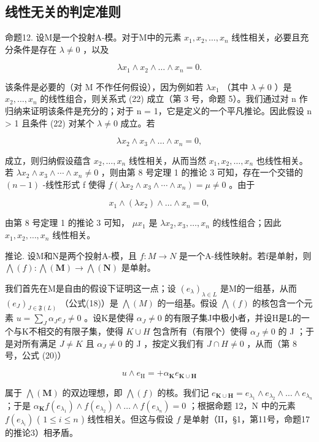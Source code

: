 \subsection{线性无关的判定准则}

命题12. 设M是一个投射A-模。对于M中的元素 \(x_1, x_2, \ldots, x_n\) 线性相关，必要且充分条件是存在 \(\lambda \neq 0\) ，以及

\[
\lambda x _ {1} \wedge x _ {2} \wedge \dots \wedge x _ {n} = 0.\tag{22}
\]

该条件是必要的（对 M 不作任何假设），因为例如若 \(\lambda x_{1}\) （其中 \(\lambda \neq 0\) ）是 \(x_{2}, \ldots, x_{n}\) 的线性组合，则关系式 (22) 成立（第 3 号，命题 5）。我们通过对 n 作归纳来证明该条件是充分的；对于 n = 1，它是定义的一个平凡推论。因此假设 n \textgreater{} 1 且条件 (22) 对某个 \(\lambda \neq 0\) 成立。若

\[
\lambda x _ {2} \wedge x _ {3} \wedge \dots \wedge x _ {n} = 0,
\]

成立，则归纳假设蕴含 \(x_{2},\ldots,x_{n}\) 线性相关，从而当然 \(x_{1},x_{2},\ldots,x_{n}\) 也线性相关。若 \(\lambda x_{2}\wedge x_{3}\wedge\cdots\wedge x_{n}\neq0\) ，则由第 8 号定理 1 的推论 3 可知，存在一个交错的 \((n-1)\) -线性形式 f 使得 \(f(\lambda x_{2}\wedge x_{3}\wedge\cdots\wedge x_{n})=\mu\neq0\) 。由于

\[
x _ {1} \wedge (\lambda x _ {2}) \wedge \dots \wedge x _ {n} = 0,
\]

由第 8 号定理 1 的推论 3 可知， \(\mu x_{1}\) 是 \(\lambda x_{2}, x_{3}, \ldots, x_{n}\) 的线性组合；因此 \(x_{1}, x_{2}, \ldots, x_{n}\) 线性相关。

推论. 设M和N是两个投射A-模，且 \(f:M\to N\) 是一个A-线性映射。若f是单射，则 \(\bigwedge(f):\bigwedge(\mathbf{M})\to\bigwedge(\mathbf{N})\) 是单射。

我们首先在M是自由的假设下证明这一点；设 \((e_{\lambda})_{\lambda \in L}\) 是M的一组基，从而 \((e_{J})_{J \in \mathfrak{F}(L)}\) （公式(18)）是 \(\bigwedge(M)\) 的一组基。假设 \(\bigwedge(f)\) 的核包含一个元素 \(u = \sum_{J} \alpha_{J} e_{J} \neq 0\) 。设K是使得 \(\alpha_{J} \neq 0\) 的有限子集J中极小者，并设H是L的一个与K不相交的有限子集，使得 \(K \cup H\) 包含所有（有限个）使得 \(\alpha_{J} \neq 0\) 的 J ；于是对所有满足 \(J \neq K\) 且 \(\alpha_{J} \neq 0\) 的 J ，按定义我们有 \(J \cap H \neq 0\) ，从而（第 8 号，公式 (20)）

\[
u \wedge e _ {\mathrm{H}} = + \alpha_ {\mathbf {K}} e _ {\mathbf {K} \cup \mathbf {H}}
\]

属于 \(\bigwedge (\mathbf{M})\) 的双边理想，即 \(\bigwedge (f)\) 的核。我们记 \(e_{\mathbf{K} \cup \mathbf{H}} = e_{\lambda_1} \wedge e_{\lambda_2} \wedge \dots \wedge e_{\lambda_n}\) ；于是 \(\alpha_{\mathbf{K}} f(e_{\lambda_1}) \wedge f(e_{\lambda_2}) \wedge \dots \wedge f(e_{\lambda_n}) = 0\) ；根据命题 12，N 中的元素 \(f(e_{\lambda_i})\) ( \(1 \leqslant i \leqslant n\) ) 线性相关。但这与假设 \(f\) 是单射（II，§1，第11号，命题17的推论3）相矛盾。

